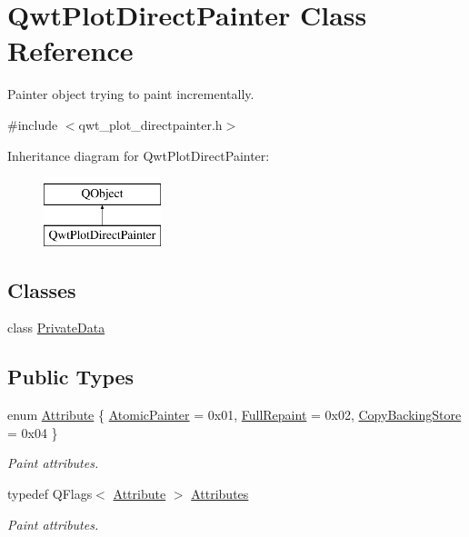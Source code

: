 \hypertarget{class_qwt_plot_direct_painter}{\section{Qwt\-Plot\-Direct\-Painter Class Reference}
\label{class_qwt_plot_direct_painter}
}


Painter object trying to paint incrementally.  




{\ttfamily \#include $<$qwt\-\_\-plot\-\_\-directpainter.\-h$>$}

Inheritance diagram for Qwt\-Plot\-Direct\-Painter\-:\begin{figure}[H]
\begin{center}
\leavevmode
\includegraphics[height=2.000000cm]{class_qwt_plot_direct_painter}
\end{center}
\end{figure}
\subsection*{Classes}
\begin{DoxyCompactItemize}
\item 
class \hyperlink{class_qwt_plot_direct_painter_1_1_private_data}{Private\-Data}
\end{DoxyCompactItemize}
\subsection*{Public Types}
\begin{DoxyCompactItemize}
\item 
enum \hyperlink{class_qwt_plot_direct_painter_a38f72175526a1a748d311763707cf934}{Attribute} \{ \hyperlink{class_qwt_plot_direct_painter_a38f72175526a1a748d311763707cf934a95bfb017daa98b23665c1de06e8bd8e5}{Atomic\-Painter} = 0x01, 
\hyperlink{class_qwt_plot_direct_painter_a38f72175526a1a748d311763707cf934a133cb5ae512ffa0f0633c9d7bd423ff4}{Full\-Repaint} = 0x02, 
\hyperlink{class_qwt_plot_direct_painter_a38f72175526a1a748d311763707cf934a8b04f057d6223852a87bdd319dcf4711}{Copy\-Backing\-Store} = 0x04
 \}
\begin{DoxyCompactList}\small\item\em Paint attributes. \end{DoxyCompactList}\item 
typedef Q\-Flags$<$ \hyperlink{class_qwt_plot_direct_painter_a38f72175526a1a748d311763707cf934}{Attribute} $>$ \hyperlink{class_qwt_plot_direct_painter_a26a66587377067b3bc0539274370693f}{Attributes}
\begin{DoxyCompactList}\small\item\em Paint attributes. \end{DoxyCompactList}\end{DoxyCompactItemize}
